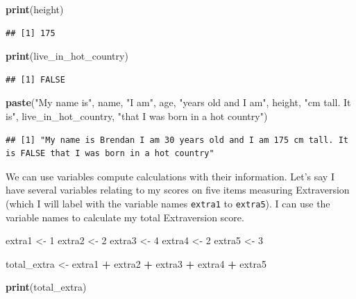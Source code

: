 \documentclass[
]{book}
\newenvironment{Shaded}{\begin{snugshade}}{\end{snugshade}}
\newcommand{\DecValTok}[1]{\textcolor[rgb]{0.00,0.00,0.81}{#1}}
\newcommand{\FunctionTok}[1]{\textcolor[rgb]{0.13,0.29,0.53}{\textbf{#1}}}
\newcommand{\NormalTok}[1]{#1}
\newcommand{\OtherTok}[1]{\textcolor[rgb]{0.56,0.35,0.01}{#1}}
\newcommand{\SpecialCharTok}[1]{\textcolor[rgb]{0.81,0.36,0.00}{\textbf{#1}}}
\newcommand{\StringTok}[1]{\textcolor[rgb]{0.31,0.60,0.02}{#1}}
\begin{document}
\begin{Shaded}
\begin{Highlighting}[]
\FunctionTok{print}\NormalTok{(height)}
\end{Highlighting}
\end{Shaded}

\begin{verbatim}
## [1] 175
\end{verbatim}

\begin{Shaded}
\begin{Highlighting}[]
\FunctionTok{print}\NormalTok{(live\_in\_hot\_country)}
\end{Highlighting}
\end{Shaded}

\begin{verbatim}
## [1] FALSE
\end{verbatim}

\begin{Shaded}
\begin{Highlighting}[]
\FunctionTok{paste}\NormalTok{(}\StringTok{"My name is"}\NormalTok{, name, }\StringTok{"I am"}\NormalTok{, age, }\StringTok{"years old and I am"}\NormalTok{, height, }\StringTok{"cm tall. It is"}\NormalTok{, live\_in\_hot\_country, }\StringTok{"that I was born in a hot country"}\NormalTok{)}
\end{Highlighting}
\end{Shaded}

\begin{verbatim}
## [1] "My name is Brendan I am 30 years old and I am 175 cm tall. It is FALSE that I was born in a hot country"
\end{verbatim}

We can use variables compute calculations with their information. Let's say I have several variables relating to my scores on five items measuring Extraversion (which I will label with the variable names \texttt{extra1} to \texttt{extra5}). I can use the variable names to calculate my total Extraversion score.

\begin{Shaded}
\begin{Highlighting}[]
\NormalTok{extra1 }\OtherTok{\textless{}{-}} \DecValTok{1}
\NormalTok{extra2 }\OtherTok{\textless{}{-}} \DecValTok{2}
\NormalTok{extra3 }\OtherTok{\textless{}{-}} \DecValTok{4}
\NormalTok{extra4 }\OtherTok{\textless{}{-}} \DecValTok{2}
\NormalTok{extra5 }\OtherTok{\textless{}{-}} \DecValTok{3}

\NormalTok{total\_extra }\OtherTok{\textless{}{-}}\NormalTok{ extra1 }\SpecialCharTok{+}\NormalTok{ extra2 }\SpecialCharTok{+}\NormalTok{ extra3 }\SpecialCharTok{+}\NormalTok{ extra4 }\SpecialCharTok{+}\NormalTok{ extra5}

\FunctionTok{print}\NormalTok{(total\_extra)}
\end{Highlighting}
\end{Shaded}
\end{document}

